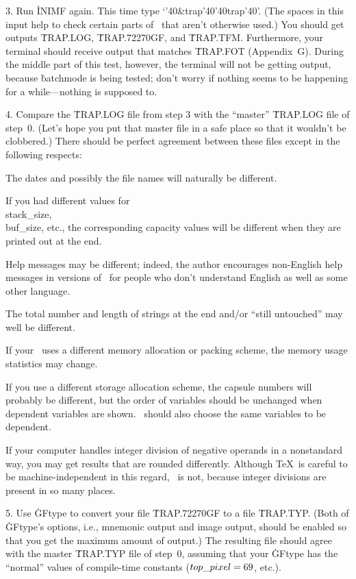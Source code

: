 \def\sp{{\char'40}}
\item{3.} Run \.{INIMF} again. This time type `\.{\sp\&trap\sp\sp trap\sp}'.
(The spaces in this input help to check certain parts of \MF\ that
aren't otherwise used.) You should get outputs \.{TRAP.LOG}, \.{TRAP.72270GF},
and \.{TRAP.TFM}.
Furthermore, your terminal should receive output that matches \.{TRAP.FOT}
(Appendix~G). During the middle part of this test, however, the terminal
will not be getting output, because \.{batchmode} is being
tested; don't worry if nothing seems to be happening for a while---nothing
is supposed to.

\item{4.} Compare the \.{TRAP.LOG} file from step 3 with the ``master''
\.{TRAP.LOG} file of step~0. (Let's hope you put that master file in a
safe place so that it wouldn't be clobbered.) There should be perfect
agreement between these files except in the following respects:

 The dates and possibly the file names will
naturally be different.

 If you had different values for \\{stack\_size}, \\{buf\_size},
etc., the corresponding capacity values will be different when they
are printed out at the end.

 Help messages may be different; indeed, the author encourages
non-English help messages in versions of \MF\ for people who don't
understand English as well as some other language.

 The total number and length of strings at the end and/or
``still untouched'' may well be different.

 If your \MF\ uses a different memory allocation or
packing scheme, the memory usage statistics may change.

 If you use a different storage allocation scheme, the
capsule numbers will probably be different, but the order of variables
should be unchanged when dependent variables are shown. \MF\ should also
choose the same variables to be dependent.

 If your computer handles integer division of negative operands
in a nonstandard way, you may get results that are rounded differently.
Although \TeX\ is careful to be machine-independent in this regard,
\MF\ is not, because integer divisions are present in so many places.

\item{5.} Use \.{GFtype} to convert your file \.{TRAP.72270GF} to a file
\.{TRAP.TYP}. (Both of \.{GFtype}'s options, i.e., mnemonic output and image
output, should be enabled so that you get the maximum amount of output.)
The resulting file should agree with the master \.{TRAP.TYP} file of step~0,
assuming that your \.{GFtype} has the ``normal'' values of compile-time
constants ($\\{top\_pixel}=69$, etc.).

